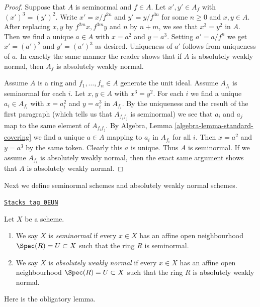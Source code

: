 \begin{proof}
Suppose that $A$ is seminormal and $f \in A$. Let $x', y' \in A_f$
with $(x')^3 = (y')^2$. Write $x' = x/f^{2n}$ and $y' = y/f^{3n}$
for some $n \geq 0$ and $x, y \in A$. After replacing $x, y$
by $f^{2m}x, f^{3m}y$ and $n$ by $n + m$, we see that
$x^3 = y^2$ in $A$. Then we find a unique $a \in A$ with
$x = a^2$ and $y = a^3$. Setting $a' = a/f^n$ we get
$x' = (a')^2$ and $y' = (a')^3$ as desired. Uniqueness
of $a'$ follows from uniqueness of $a$.
In exactly the same manner the reader shows that if $A$ is
absolutely weakly normal,
then $A_f$ is absolutely weakly normal.

\medskip\noindent
Assume $A$ is a ring and $f_1, \ldots, f_n \in A$ generate the unit
ideal. Assume $A_{f_i}$ is seminormal for each $i$.
Let $x, y \in A$ with $x^3 = y^2$. For each $i$ we find a unique
$a_i \in A_{f_i}$ with $x = a_i^2$ and $y = a_i^3$ in $A_{f_i}$.
By the uniqueness and the result of the first paragraph (which
tells us that $A_{f_if_j}$ is seminormal) we see that
$a_i$ and $a_j$ map to the same element of $A_{f_if_j}$.
By Algebra, Lemma \ref{algebra-lemma-standard-covering}
we find a unique $a \in A$
mapping to $a_i$ in $A_{f_i}$ for all $i$.
Then $x = a^2$ and $y = a^3$ by the same token. Clearly this $a$ is unique.
Thus $A$ is seminormal. If we assume $A_{f_i}$ is absolutely weakly normal,
then the exact same argument shows that $A$ is absolutely weakly normal.
\end{proof}

Next we define seminormal schemes and absolutely weakly normal schemes.

\begin{definition}[Seminormal]
\label{morphisms-definition-seminormal}
\href{https://stacks.math.columbia.edu/tag/0EUN}{\texttt{Stacks tag 0EUN}}

Let $X$ be a scheme.
\begin{enumerate}
\item We say $X$ is {\it seminormal} if every $x \in X$ has
an affine open neighbourhood $\Spec(R) = U \subset X$
such that the ring $R$ is seminormal.
\item We say $X$ is {\it absolutely weakly normal} if every $x \in X$ has
an affine open neighbourhood $\Spec(R) = U \subset X$
such that the ring $R$ is absolutely weakly normal.
\end{enumerate}
\end{definition}

Here is the obligatory lemma.

